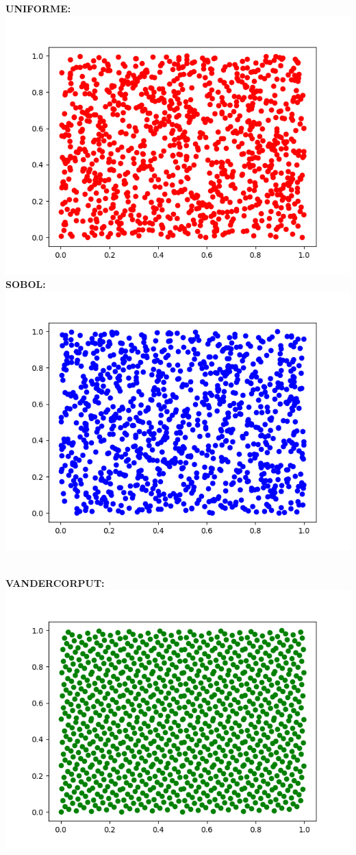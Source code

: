 \documentclass[pt12]{article}
\begin{document}
\textbf{UNIFORME:}\\
\includegraphics[scale=0.8]{uniform.png}\\
\newpage
\textbf{SOBOL:}\\
\includegraphics[scale=0.8]{sobol.png}\\
\ 

\textbf{VANDERCORPUT:}\\
\includegraphics[scale=0.8]{van.png}\\
\ 
\end{document}
